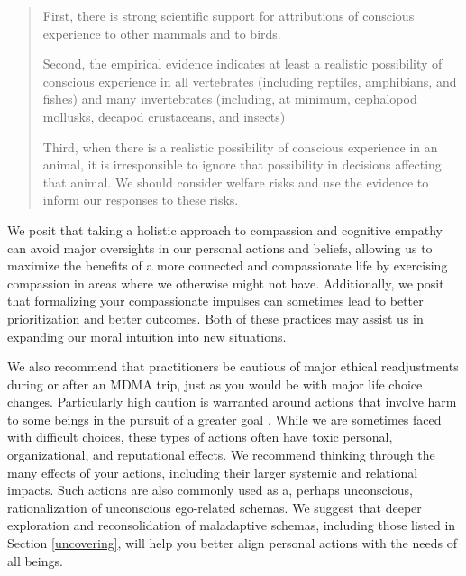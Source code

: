 \documentclass[12pt,letterpaper]{article}
\begin{document}
\begin{quotation}
    First, there is strong scientific support for attributions of conscious experience to other mammals and to birds.
    
    Second, the empirical evidence indicates at least a realistic possibility of conscious experience in all vertebrates (including reptiles, amphibians, and fishes) and many invertebrates (including, at minimum, cephalopod mollusks, decapod crustaceans, and insects)

    Third, when there is a realistic possibility of conscious experience in an animal, it is irresponsible to ignore that possibility in decisions affecting that animal. We should consider welfare risks and use the evidence to inform our responses to these risks.
\end{quotation}

We posit that taking a holistic approach to compassion and cognitive empathy can avoid major oversights in our personal actions and beliefs, allowing us to maximize the benefits of a more connected and compassionate life by exercising compassion in areas where we otherwise might not have. Additionally, we posit that formalizing your compassionate impulses can sometimes lead to better prioritization and better outcomes. Both of these practices may assist us in expanding our moral intuition into new situations.

We also recommend that practitioners be cautious of major ethical readjustments during or after an MDMA trip, just as you would be with major life choice changes. Particularly high caution is warranted around actions that involve harm to some beings in the pursuit of a greater goal \cite{askellSelfServing}. While we are sometimes faced with difficult choices, these types of actions often have toxic personal, organizational, and reputational effects. We recommend thinking through the many effects of your actions, including their larger systemic and relational impacts. Such actions are also commonly used as a, perhaps unconscious, rationalization of unconscious ego-related schemas. We suggest that deeper exploration and reconsolidation of maladaptive schemas, including those listed in Section \ref{uncovering}, will help you better align personal actions with the needs of all beings.
\end{document}
